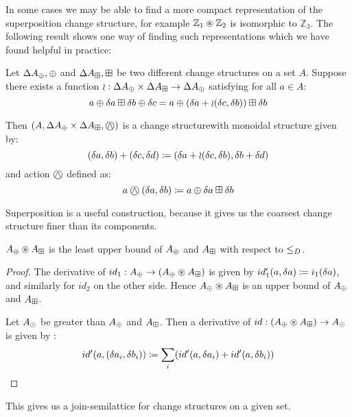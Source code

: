 In some cases we may be able to find a more compact representation of the
superposition change structure, for example $\mathbb{Z}_1 \circledast \mathbb{Z}_2$ is 
isomorphic to $\mathbb{Z}_3$. The following result shows one way of finding such representations which
we have found helpful in practice:

\begin{prop}
  Let $\Delta A_\oplus, \oplus$ and $\Delta A_\boxplus, \boxplus$ be two different change structures on
  a set $A$. Suppose there exists a function
  $\wr : \Delta A_\oplus \times \Delta A_\boxplus \rightarrow \Delta A_\oplus$ satisfying for
  all $a \in A$:
  $$
    a \oplus \delta a \boxplus \delta b \oplus \delta c
    = a \oplus (\delta a + \wr(\delta c,\delta b)) \boxplus \delta b
  $$

  Then $\cstruct{A}{\changes{A}_\cplus \times \changes{A}_\cpluss}{\cplussym{\wedge}}$
  is a change structurewith monoidal structure given by:
  $$
    (\delta a, \delta b) + (\delta c, \delta d) \coloneqq 
    (\delta a + \wr(\delta c, \delta b), \delta b + \delta d)
  $$
  and action $\cplussym{\wedge}$ defined as:
  $$
    a \cplussym{\wedge} (\change{a}, \change{b}) \defeq a \cplus \change{a} \cpluss \change{b}
  $$
\end{prop}

Superposition is a useful construction, because it gives us the coarsest
change structure finer than its components.

\begin{corollary}
  $A_\oplus \circledast A_\boxplus$ is the least upper bound of $A_\oplus$ and $A_\boxplus$ with respect to $\leq_D$.
\end{corollary}
\begin{proof}
  The derivative of $id_1: A_\oplus \rightarrow (A_\oplus \circledast
  A_\boxplus)$ is given by $id_1'(a, \delta a) \coloneqq 
  i_1(\delta a)$, and similarly for $id_2$ on the other side. Hence $A_\oplus \circledast A_\boxplus$ 
  is an upper bound of $A_\oplus$ and $A_\boxplus$.

  Let $A_\odot$ be greater than $A_\oplus$ and $A_\boxplus$.
  Then a
  derivative of $id: (A_\oplus \circledast A_\boxplus) \rightarrow A_\odot$ is
  given by :
  $$
  id'(a, (\delta a_i, \delta b_i)) \coloneqq 
    \sum_i (id'(a, \delta a_i) + id'(a, \delta b_i))
  $$
\end{proof}

This gives us a join-semilattice for change structures on a given set.

